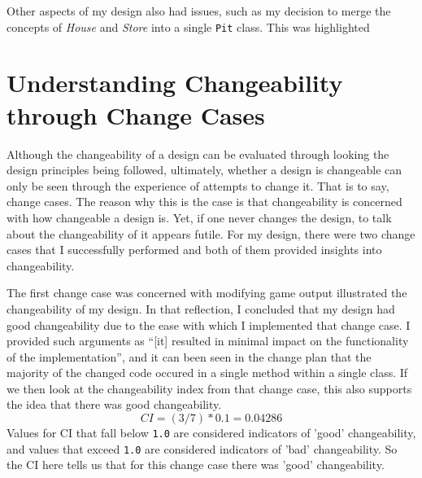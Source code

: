 \documentclass[10pt, a4paper, conference]{IEEEtran}
\begin{document}
Other aspects of my design also had issues, such as my decision to merge the
concepts of \textit{House} and \textit{Store} into a single \texttt{Pit} class.
This was highlighted 

\section{Understanding Changeability through Change Cases}
Although the changeability of a design can be evaluated through looking the
design principles being followed, ultimately, whether a design is changeable
can only be seen through the experience of attempts to change it. That is to
say, change cases. The reason why this is the case is that changeability is
concerned with how changeable a design is. Yet, if one never changes the
design, to talk about the changeability of it appears futile. For my design, 
there were two change cases that I successfully performed and both of them 
provided insights into changeability.

The first change case was concerned with modifying game output
\cite{a4-change-case} illustrated the changeability of my design. In that
reflection, I concluded that my design had good changeability due to the ease
with which I implemented that change case. I provided such arguments as ``[it]
resulted in minimal impact on the functionality of the implementation'', and it
can been seen in the change plan that the majority of the changed code occured
in a single method within a single class. If we then look at the changeability
index from that change case, this also supports the idea that there was good
changeability.
\begin{equation}
  CI = (3 / 7) * 0.1 = 0.04286
\end{equation}
Values for CI that fall below \texttt{1.0} are considered indicators of 'good'
changeability, and values that exceed \texttt{1.0} are considered indicators of
'bad' changeability. So the CI here tells us that for this change case there
was 'good' changeability. 
\end{document}
